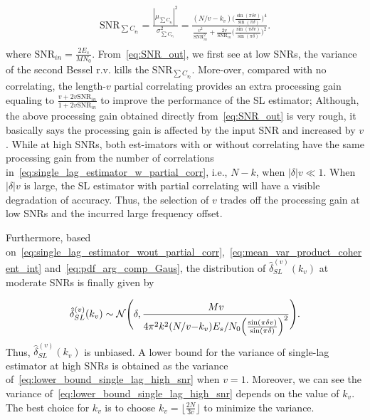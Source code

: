 \begin{equation}
  \begin{aligned}
    \label{eq:SNR_out}
    \text{SNR}_{\sum C_{\digamma_l}}=\frac{|\mu_{\sum C_{\digamma_l}}|^2}{\sigma^2_{\sum C_{\digamma_l}}} 
    =\frac{(N/v-k_v)\Big(\frac{\sin(\pi \delta v)}{\sin(\pi \delta)}\Big)^4}
    {\frac{v^2}{\text{SNR}_{in}^2}+\frac{2v}{\text{SNR}_{in}}\Big(\frac{\sin(\pi \delta v)}{\sin(\pi \delta)}\Big)^2}. \\
  \end{aligned}
\end{equation}
where $\text{SNR}_{in}=\frac{2E_s}{MN_0}$. From~\eqref{eq:SNR_out},
we first see at low SNRs, the variance of the second Bessel r.v. kills the $\text{SNR}_{\sum C_{\digamma_l}}$. More-over,  
compared with no correlating, the length-$v$ partial correlating provides an
extra processing gain equaling to $\frac{v+2v\text{SNR}_{in}}{1+2v\text{SNR}_{in}}$ to improve
the performance of the SL estimator; Although, the above processing gain obtained
directly from~\eqref{eq:SNR_out} is very rough, it basically says the 
processing gain is affected by the input SNR and increased by $v$.
While at high SNRs, both est-imators with or without correlating
have the same processing gain from the number of correlations in~\eqref{eq:single_lag_estimator_w_partial_corr}, 
i.e., $N{-}k$, when $|\delta|v \ll 1$. When $|\delta|v$ is large, the SL estimator with partial correlating will have a visible 
degradation of accuracy. Thus, the selection of $v$ trades off the processing gain at low SNRs
and the incurred large frequency offset. 

Furthermore, based on~\eqref{eq:single_lag_estimator_wout_partial_corr},~\eqref{eq:mean_var_product_coherent_int}
and~\eqref{eq:pdf_arg_comp_Gaus}, the distribution of $\hat{\delta}_{SL}^{(v)}(k_v)$ at moderate SNRs is finally given by

\begin{equation}
  \label{eq:lower_bound_single_lag_high_snr}
  \hat{\delta}_{SL}^{(v)}(k_v) \sim \mathcal{N} \Bigg(\delta,\frac{Mv}{4\pi^2k^2(N/v{-}k_v)E_s/N_0\Big(\frac{\sin(\pi \delta v)}{\sin(\pi \delta)}\Big)^2}\Bigg).
\end{equation}
Thus, $\hat{\delta}_{SL}^{(v)}(k_v)$ is unbiased. 
A lower bound for the variance of single-lag estimator at high SNRs is obtained
as the variance of~\eqref{eq:lower_bound_single_lag_high_snr} when $v=1$.
Moreover, we can see the variance of~\eqref{eq:lower_bound_single_lag_high_snr} depends on
the value of $k_v$. The best choice for $k_v$ is to choose 
$k_v=\lfloor\frac{2N}{3v}\rfloor$ to minimize the variance.

